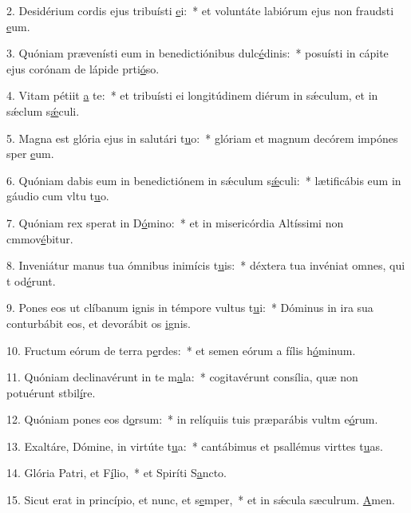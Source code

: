 2. Desidérium cordis ejus tribuísti \uline{e}i:~* et voluntáte labiórum ejus non fraudsti \uline{e}um.\par 
3. Quóniam prævenísti eum in benedictiónibus dulc\uline{é}dinis:~* posuísti in cápite ejus corónam de lápide prti\uline{ó}so.\par 
4. Vitam pétiit \uline{a} te:~* et tribuísti ei longitúdinem diérum in sǽculum, et in sǽclum s\uline{ǽ}culi.\par 
5. Magna est glória ejus in salutári t\uline{u}o:~* glóriam et magnum decórem impónes sper \uline{e}um.\par 
6. Quóniam dabis eum in benedictiónem in sǽculum s\uline{ǽ}culi:~* lætificábis eum in gáudio cum vltu t\uline{u}o.\par 
7. Quóniam rex sperat in D\uline{ó}mino:~* et in misericórdia Altíssimi non cmmov\uline{é}bitur.\par 
8. Inveniátur manus tua ómnibus inimícis t\uline{u}is:~* déxtera tua invéniat omnes, qui t od\uline{é}runt.\par 
9. Pones eos ut clíbanum ignis in témpore vultus t\uline{u}i:~* Dóminus in ira sua conturbábit eos, et devorábit os \uline{i}gnis.\par 
10. Fructum eórum de terra p\uline{e}rdes:~* et semen eórum a fílis h\uline{ó}minum.\par 
11. Quóniam declinavérunt in te m\uline{a}la:~* cogitavérunt consília, quæ non potuérunt stbil\uline{í}re.\par 
12. Quóniam pones eos d\uline{o}rsum:~* in relíquiis tuis præparábis vultm e\uline{ó}rum.\par 
13. Exaltáre, Dómine, in virtúte t\uline{u}a:~* cantábimus et psallémus virttes t\uline{u}as.\par 
14. Glória Patri, et F\uline{í}lio,~* et Spiríti S\uline{a}ncto.\par 
15. Sicut erat in princípio, et nunc, et s\uline{e}mper,~* et in sǽcula sæculrum. \uline{A}men.\par 
